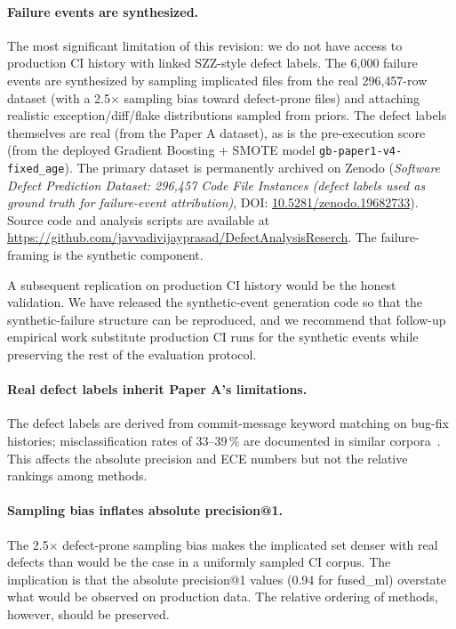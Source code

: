 \documentclass[10pt,twocolumn,letterpaper]{article}
\begin{document}
\paragraph{Failure events are synthesized.} The most significant
limitation of this revision: we do not have access to production CI
history with linked SZZ-style defect labels. The 6{,}000 failure
events are synthesized by sampling implicated files from the real
296{,}457-row dataset (with a 2.5$\times$ sampling bias toward
defect-prone files) and attaching realistic exception/diff/flake
distributions sampled from priors. The defect labels themselves are
real (from the Paper A dataset), as is the pre-execution score
(from the deployed Gradient Boosting + SMOTE model
\texttt{gb-paper1-v4-fixed\_age}). The primary dataset is permanently archived on Zenodo (\textit{Software Defect Prediction Dataset: 296,457 Code File Instances (defect labels used as ground truth for failure-event attribution)}, DOI: \href{https://doi.org/10.5281/zenodo.19682733}{10.5281/zenodo.19682733}). Source code and analysis scripts are available at \url{https://github.com/javvadivijayprasad/DefectAnalysisReserch}. The failure-framing is the
synthetic component.

A subsequent replication on production CI history would be the
honest validation. We have released the synthetic-event generation
code so that the synthetic-failure structure can be reproduced, and
we recommend that follow-up empirical work substitute production CI
runs for the synthetic events while preserving the rest of the
evaluation protocol.

\paragraph{Real defect labels inherit Paper A's limitations.} The
defect labels are derived from commit-message keyword matching on
bug-fix histories; misclassification rates of 33--39\,\% are
documented in similar
corpora~\citep{bird2009,herzig2013}. This affects the absolute
precision and ECE numbers but not the relative rankings among
methods.

\paragraph{Sampling bias inflates absolute precision@1.} The
2.5$\times$ defect-prone sampling bias makes the implicated set
denser with real defects than would be the case in a uniformly
sampled CI corpus. The implication is that the absolute precision@1
values (0.94 for fused\_ml) overstate what would be observed on
production data. The relative ordering of methods, however, should
be preserved.
\end{document}
